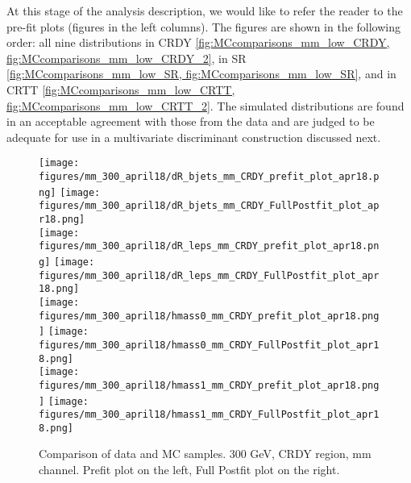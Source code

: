 \begin{small}
At this stage of the analysis description, we would like to refer the reader to the pre-fit plots (figures in the left columns). The figures are shown in the following order: all nine distributions in CRDY \ref{fig:MCcomparisons_mm_low_CRDY, fig:MCcomparisons_mm_low_CRDY_2}, in SR \ref{fig:MCcomparisons_mm_low_SR, fig:MCcomparisons_mm_low_SR}, and in CRTT \ref{fig:MCcomparisons_mm_low_CRTT, fig:MCcomparisons_mm_low_CRTT_2}. The simulated distributions are found in an acceptable agreement with those from the data and are judged to be adequate for use in a multivariate discriminant construction discussed next. 

\begin{figure}[H]
  \begin{center}
    \texttt{[image: figures/mm\_300\_april18/dR\_bjets\_mm\_CRDY\_prefit\_plot\_apr18.png]}
    \texttt{[image: figures/mm\_300\_april18/dR\_bjets\_mm\_CRDY\_FullPostfit\_plot\_apr18.png]}\\
    \texttt{[image: figures/mm\_300\_april18/dR\_leps\_mm\_CRDY\_prefit\_plot\_apr18.png]}
    \texttt{[image: figures/mm\_300\_april18/dR\_leps\_mm\_CRDY\_FullPostfit\_plot\_apr18.png]}\\
    \texttt{[image: figures/mm\_300\_april18/hmass0\_mm\_CRDY\_prefit\_plot\_apr18.png]}
    \texttt{[image: figures/mm\_300\_april18/hmass0\_mm\_CRDY\_FullPostfit\_plot\_apr18.png]}\\
    \texttt{[image: figures/mm\_300\_april18/hmass1\_mm\_CRDY\_prefit\_plot\_apr18.png]}
    \texttt{[image: figures/mm\_300\_april18/hmass1\_mm\_CRDY\_FullPostfit\_plot\_apr18.png]}\\
    \caption[Data-MC comparison in CRDY.]{Comparison of data and MC samples. 300 GeV, CRDY region, mm channel. Prefit plot on the left, Full Postfit plot on the right.}
    \label{fig:MCcomparisons_mm_low_CRDY}
  \end{center}
\end{figure}


\end{small}
